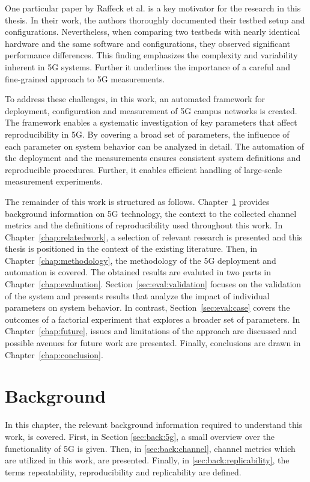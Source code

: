 One particular paper by Raffeck et al.\cite{raffeck2024parameterizing} is a key motivator for the research in this thesis.
In their work, the authors thoroughly documented their testbed setup and configurations.
Nevertheless, when comparing two testbeds with nearly identical hardware and the same software and configurations,
they observed significant performance differences.
This finding emphasizes the complexity and variability inherent in 5G systems.
Further it underlines the importance of a careful and fine-grained approach to 5G measurements.

To address these challenges, in this work, an automated framework for deployment, configuration and measurement of 5G campus networks is created.
The framework enables a systematic investigation of key parameters that affect reproducibility in 5G.
By covering a broad set of parameters, the influence of each parameter on system behavior can be analyzed in detail.
The automation of the deployment and the measurements ensures consistent system definitions and reproducible procedures.
Further, it enables efficient handling of large-scale measurement experiments.

The remainder of this work is structured as follows.
Chapter~\ref{chap:background} provides background information on 5G technology, the context to the collected  channel metrics and the definitions of reproducibility used throughout this work.
In Chapter~\ref{chap:relatedwork}, a selection of relevant research is presented and this thesis is positioned in the context of the existing literature.
Then, in Chapter~\ref{chap:methodology}, the methodology of the 5G deployment and automation is covered.
The obtained results are evaluted in two parts in Chapter~\ref{chap:evaluation}.
Section~\ref{sec:eval:validation} focuses on the validation of the system and presents results that analyze the impact of individual parameters on system behavior.
In contrast, Section~\ref{sec:eval:case} covers the outcomes of a factorial experiment that explores a broader set of parameters.
In Chapter~\ref{chap:future}, issues and limitations of the approach are discussed and possible avenues for future work are presented.
Finally, conclusions are drawn in Chapter~\ref{chap:conclusion}.


\chapter{Background}\label{chap:background}

In this chapter, the relevant background information required to understand this work, is covered.
First, in Section \ref{sec:back:5g}, a small overview over the functionality of 5G is given.
Then, in \ref{sec:back:channel}, channel metrics which are utilized in this work, are presented.
Finally, in \ref{sec:back:replicability}, the terms repeatability, reproducibility and replicability are defined.

